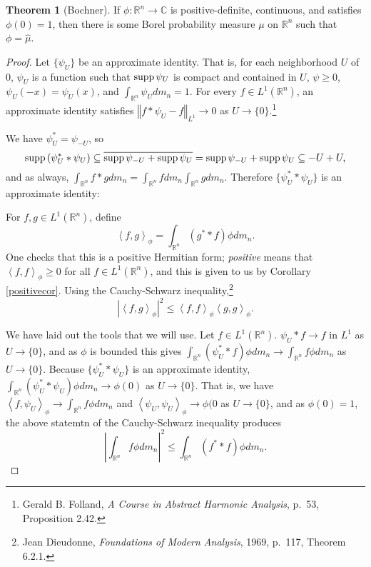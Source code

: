 \documentclass{article}
\newcommand{\inner}[2]{\left\langle #1, #2 \right\rangle}
\newcommand{\supp}{\ensuremath\mathrm{supp}\,}
\newcommand{\norm}[1]{\left\Vert #1 \right\Vert}
\theoremstyle{definition}
\newtheorem{theorem}{Theorem}
\theoremstyle{definition}
\begin{document}
\begin{theorem}[Bochner]
If $\phi:\mathbb{R}^n \to \mathbb{C}$ is positive-definite, continuous, and satisfies $\phi(0)=1$, then there is some
Borel probability measure $\mu$ on $\mathbb{R}^n$ such that $\phi=\hat{\mu}$.
\end{theorem}
\begin{proof}
Let $\{\psi_U\}$ be an approximate identity. That is, for each  neighborhood $U$ of $0$, $\psi_U$ is a function such that
$\supp \psi_U$ is compact and contained in $U$,
$\psi \geq
0$,
$\psi_U(-x)=\psi_U(x)$, and  $\int_{\mathbb{R}^n} \psi_U dm_n =1$. For every $f \in L^1(\mathbb{R}^n)$, an approximate identity satisfies $\norm{f*\psi_U -f}_{L^1}\to 0$ as
$U \to \{0\}$.\footnote{Gerald B. Folland, {\em A Course in Abstract Harmonic Analysis}, p.~53, Proposition 2.42.}

We have $\psi_U^*=\psi_{-U}$, so
\[
\supp (\psi_U^* * \psi_U) \subseteq \overline{\supp \psi_{-U} + \supp \psi_U} = \supp \psi_{-U} + \supp \psi_U \subseteq -U +U,
\]
and as always, $\int_{\mathbb{R}^n} f*g dm_n
=\int_{\mathbb{R}^n} f dm_n \int_{\mathbb{R}^n} gdm_n$.
Therefore $\{\psi_U^* * \psi_U\}$ is an approximate identity:

For $f,g \in L^1(\mathbb{R}^n)$, define
\[
\inner{f}{g}_\phi = \int_{\mathbb{R}^n} (g^* * f) \phi dm_n.
\]
One checks that this is a positive Hermitian form; {\em positive} means that $\inner{f}{f}_\phi \geq 0$ for all $f \in L^1(\mathbb{R}^n)$, and this
is given to us by Corollary \ref{positivecor}.
Using the Cauchy-Schwarz inequality,\footnote{Jean Dieudonne, {\em Foundations of Modern Analysis}, 1969, p.~117, Theorem 6.2.1.}
\[
|\inner{f}{g}_\phi|^2 \leq \inner{f}{f}_\phi \inner{g}{g}_\phi.
\]

We have  laid out the tools that we will use. Let $f \in L^1(\mathbb{R}^n)$. $\psi_U * f  \to f$ in $L^1$ as $U \to \{0\}$, and as $\phi$ is bounded
this gives $\int_{\mathbb{R}^n} (\psi_U^* * f) \phi dm_n \to \int_{\mathbb{R}^n} f\phi dm_n$ as $U \to \{0\}$. 
Because $\{\psi_U^* * \psi_U\}$ is an approximate identity, $\int_{\mathbb{R}^n} (\psi_U^* * \psi_U) \phi dm_n \to \phi(0)$ as $U \to \{0\}$. That is,
we have $\inner{f}{\psi_U}_\phi \to \int_{\mathbb{R}^n} f\phi dm_n$ and $\inner{\psi_U}{\psi_U}_\phi \to \phi(0$ as $U \to \{0\}$, and as $\phi(0)=1$,
the above statemtn of the Cauchy-Schwarz inequality produces
\begin{equation}
\left| \int_{\mathbb{R}^n} f\phi dm_n \right|^2 \leq \int_{\mathbb{R}^n} (f^* * f)\phi dm_n.
\label{sweetestimate}
\end{equation}


\end{proof}
\end{document}
